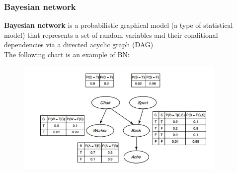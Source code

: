 \documentclass{beamer}
\begin{document}
\begin{frame}
\frametitle{Bayesian network}
\textbf{Bayesian network} is a probabilistic graphical model (a type of statistical model)
that represents a set of random variables and their conditional dependencies via a directed acyclic graph (DAG)\\
The following chart is an example of BN:\\
 \begin{figure}
     \includegraphics[width=0.9\textwidth]{bayesian.jpg}

    \end{figure}

\end{frame}
\end{document}
